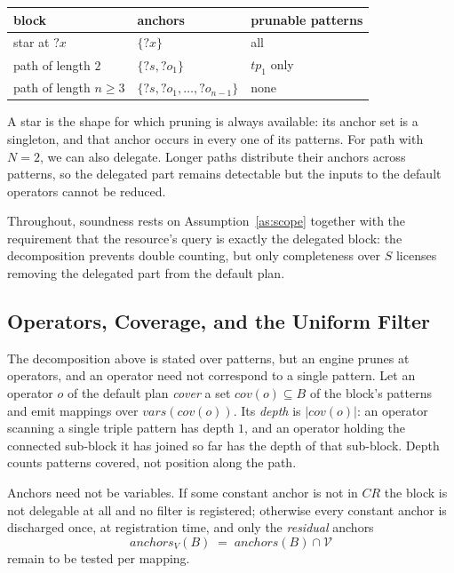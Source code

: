 \documentclass{article}
\begin{document}
\begin{center}
\begin{tabular}{lll}
\toprule
block & anchors & prunable patterns \\
\midrule
star at $?x$        & $\{?x\}$                       & all \\
path of length $2$  & $\{?s, ?o_1\}$                 & $tp_1$ only \\
path of length $n \geq 3$ & $\{?s, ?o_1, \dots, ?o_{n-1}\}$ & none \\
\bottomrule
\end{tabular}
\end{center}

A star is the shape for which pruning is always available: its anchor set is a
singleton, and that anchor occurs in every one of its patterns. For path with $N=2$, we can also delegate. Longer paths distribute
their anchors across patterns, so the delegated part remains detectable but the inputs
to the default operators cannot be reduced.

Throughout, soundness rests on Assumption~\ref{as:scope} together with the requirement
that the resource's query is exactly the delegated block: the decomposition prevents
double counting, but only completeness over $S$ licenses removing the delegated part from
the default plan.


\subsection*{Operators, Coverage, and the Uniform Filter}

The decomposition above is stated over patterns, but an engine prunes at operators, and
an operator need not correspond to a single pattern. Let an operator $o$ of the default
plan \emph{cover} a set $\mathit{cov}(o) \subseteq B$ of the block's patterns and emit
mappings over $\mathit{vars}(\mathit{cov}(o))$. Its \emph{depth} is
$|\mathit{cov}(o)|$: an operator scanning a single triple pattern has depth $1$, and an
operator holding the connected sub-block it has joined so far has the depth of that
sub-block. Depth counts patterns covered, not position along the path.

Anchors need not be variables. If some constant anchor is not in $CR$ the block is not
delegable at all and no filter is registered; otherwise every constant anchor is
discharged once, at registration time, and only the \emph{residual} anchors
\[
\mathit{anchors}_V(B) \;=\; \mathit{anchors}(B) \cap \mathcal{V}
\]
remain to be tested per mapping.
\end{document}

